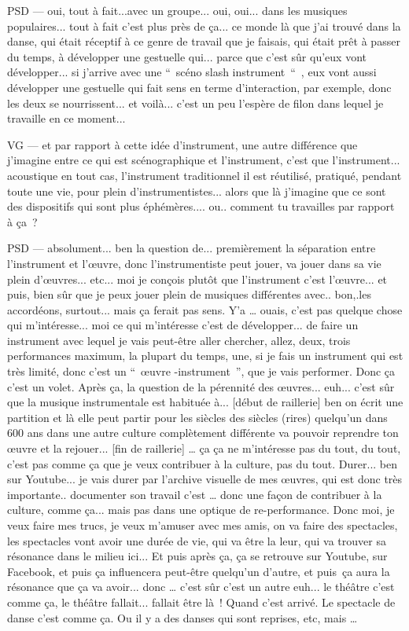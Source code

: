 PSD — oui, tout à fait...avec un groupe... oui, oui... dans les musiques populaires... tout à fait c'est plus près de ça... ce monde là que j'ai trouvé dans la danse, qui était réceptif à ce genre de travail que je faisais, qui était prêt à passer du temps, à développer une gestuelle qui... parce que c'est sûr qu'eux vont développer... si j'arrive avec une “ scéno slash instrument “ , eux vont aussi développer une gestuelle qui fait sens en terme d'interaction, par exemple, donc les deux se nourrissent... et voilà... c'est un peu l'espère de filon dans lequel je travaille en ce moment... 

VG —  et par rapport à cette idée d'instrument, une autre différence que j'imagine entre ce qui est scénographique et l'instrument, c'est que l'instrument... acoustique en tout cas, l'instrument traditionnel il est réutilisé, pratiqué, pendant toute une vie, pour plein d'instrumentistes... alors que là j'imagine que ce sont des dispositifs qui sont plus éphémères.... ou.. comment tu travailles par rapport à ça ? 

PSD — absolument... ben la question de... premièrement la séparation entre l'instrument et l'œuvre, donc l'instrumentiste peut jouer, va jouer dans sa vie plein d'œuvres... etc...  moi je conçois plutôt que l'instrument c'est l'œuvre... et puis, bien sûr que je peux jouer plein de musiques différentes avec.. bon,.les accordéons, surtout... mais ça ferait pas sens. Y'a … ouais, c'est pas quelque chose qui m'intéresse... moi ce qui m'intéresse c'est de développer... de faire un instrument avec lequel je vais peut-être aller chercher, allez, deux, trois performances maximum, la plupart du temps, une, si je fais un instrument qui est très limité, donc c'est un “ œuvre -instrument ”, que je vais performer. Donc ça c'est un volet. Après ça, la question de la pérennité des œuvres... euh... c'est sûr que la musique instrumentale est habituée à... [début de raillerie] ben on écrit une partition et là elle peut partir pour les siècles des siècles (rires)  quelqu'un dans 600 ans dans une autre culture complètement différente va pouvoir reprendre ton œuvre et la rejouer... [fin de raillerie] … ça ça ne m'intéresse pas du tout, du tout, c'est pas comme ça que je veux contribuer à la culture, pas du tout. Durer... ben sur Youtube... je vais durer par l'archive visuelle de mes œuvres, qui est donc très importante.. documenter son travail c'est … donc une façon de contribuer à la culture, comme ça... mais pas dans une optique de re-performance. Donc moi, je veux faire mes trucs, je veux m'amuser avec mes amis, on va faire des spectacles, les spectacles vont avoir une durée de vie, qui va être la leur, qui va trouver sa résonance dans le milieu ici... Et puis après ça, ça se retrouve sur Youtube, sur Facebook, et puis ça influencera peut-être quelqu'un d'autre, et puis ça aura la résonance que ça va avoir... donc … c'est sûr c'est un autre euh... le théâtre c'est comme ça, le théâtre fallait... fallait être là ! Quand c'est arrivé. Le spectacle de danse c'est comme ça. Ou il y a des danses qui sont reprises, etc, mais … 

